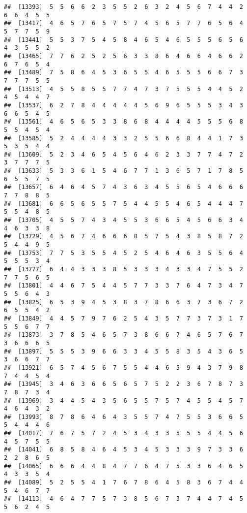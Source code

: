 \documentclass[
]{book}
\begin{document}
\begin{verbatim}
##  [13393]  5  5  6  6  2  3  5  5  2  6  3  2  4  5  6  7  4  4  2  6  6  4  5  5
##  [13417]  4  6  5  7  6  5  7  5  7  4  5  6  5  7  7  6  5  6  4  5  7  7  5  9
##  [13441]  5  5  3  7  5  4  5  8  4  6  5  4  6  5  5  5  6  5  6  4  3  5  5  2
##  [13465]  7  7  6  2  5  2  5  6  3  3  8  6  4  6  6  4  6  6  2  6  7  6  5  4
##  [13489]  7  5  8  6  4  5  3  6  5  5  4  6  5  5  5  6  6  7  3  7  7  7  5  5
##  [13513]  4  5  5  8  5  5  7  7  4  7  3  7  5  5  5  4  4  5  2  4  5  4  4  7
##  [13537]  6  2  7  8  4  4  4  4  4  5  6  9  6  5  5  5  3  4  3  6  6  5  4  5
##  [13561]  4  6  5  6  5  3  3  8  6  8  4  4  4  4  5  5  5  6  8  5  5  4  5  4
##  [13585]  5  2  4  4  4  4  3  3  2  5  5  6  6  8  4  4  1  7  3  5  3  5  4  4
##  [13609]  5  2  3  4  6  5  4  5  6  4  6  2  3  3  7  7  4  7  2  3  7  7  7  5
##  [13633]  5  3  3  6  1  5  4  6  7  7  1  3  6  5  7  1  7  8  5  6  5  5  7  5
##  [13657]  6  4  6  4  5  7  4  3  6  3  4  5  5  6  5  4  6  6  6  7  7  8  8  5
##  [13681]  6  6  5  6  5  5  7  5  4  4  5  5  4  6  5  4  4  4  7  5  5  4  8  5
##  [13705]  4  5  5  7  4  3  4  5  5  3  6  6  5  4  5  6  6  3  4  4  6  3  3  8
##  [13729]  4  5  6  7  4  6  6  6  8  5  7  5  4  3  8  5  8  7  2  5  4  4  9  5
##  [13753]  7  7  5  3  5  5  4  5  2  5  4  6  4  6  3  5  5  6  4  5  5  5  3  4
##  [13777]  6  4  4  3  3  3  8  5  3  3  3  4  3  3  4  7  5  5  2  7  7  5  6  5
##  [13801]  4  4  6  7  5  4  4  5  7  7  3  3  7  6  4  7  3  4  7  5  5  6  4  3
##  [13825]  6  5  3  9  4  5  3  8  3  7  8  6  6  3  7  3  6  7  2  6  5  5  4  2
##  [13849]  4  4  5  7  9  7  6  2  5  4  3  5  7  7  3  7  3  1  7  5  5  6  7  7
##  [13873]  3  7  8  5  4  6  5  7  3  8  6  6  7  4  6  5  7  6  7  3  6  6  6  5
##  [13897]  5  5  5  3  9  6  6  3  3  4  5  5  8  3  5  4  3  6  5  3  6  6  7  7
##  [13921]  6  5  7  4  5  6  7  5  5  4  4  6  5  9  4  3  7  9  8  7  4  4  5  4
##  [13945]  3  4  6  3  6  6  5  6  5  7  5  2  2  3  6  7  8  7  3  7  8  7  3  4
##  [13969]  3  4  4  5  4  3  5  6  5  5  7  5  7  4  5  5  4  5  7  4  6  4  3  2
##  [13993]  8  7  8  6  4  6  4  3  5  5  7  4  7  5  5  3  6  6  5  5  4  4  4  6
##  [14017]  7  6  7  5  7  2  4  5  3  4  3  3  5  5  5  4  4  5  6  4  5  7  5  5
##  [14041]  6  8  5  8  4  6  4  5  3  4  5  3  3  3  9  7  3  3  6  2  2  8  6  5
##  [14065]  6  6  6  4  4  8  4  7  7  6  4  7  5  3  3  6  4  6  5  4  3  3  5  4
##  [14089]  5  2  5  5  4  1  7  6  7  8  6  4  5  8  3  6  7  4  4  5  4  6  7  7
##  [14113]  4  6  4  7  7  5  7  3  8  5  6  7  3  7  4  4  7  4  5  5  6  2  4  5

\end{verbatim}
\end{document}
